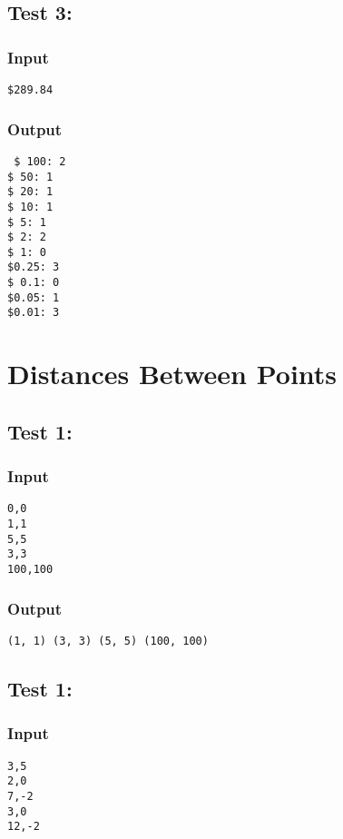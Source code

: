 \documentclass[9pt]{extarticle}
\begin{document}
\begin{multicols}{2}
\subsection*{Test 3:}

\subsubsection*{Input}
\texttt{\$289.84}
\subsubsection*{Output}
\texttt{%
\$ 100: 2\\
\$  50: 1\\
\$  20: 1\\
\$  10: 1\\
\$   5: 1\\
\$   2: 2\\
\$   1: 0\\
\$0.25: 3\\
\$ 0.1: 0\\
\$0.05: 1\\
\$0.01: 3}

\section{Distances Between Points}
\subsection*{Test 1:}
\subsubsection*{Input}
\texttt{0,0\\
1,1\\
5,5\\
3,3\\
100,100}

\subsubsection*{Output}
\texttt{(1, 1) (3, 3) (5, 5) (100, 100)}

\subsection*{Test 1:}
\subsubsection*{Input}
\texttt{3,5\\
2,0\\
7,-2\\
3,0\\
12,-2}


\end{multicols}
\end{document}
